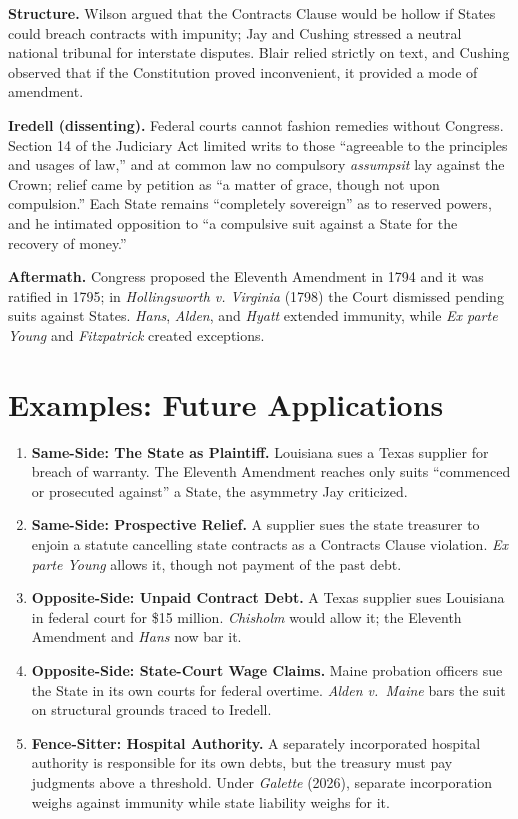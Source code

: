 \documentclass[12pt]{article}
\begin{document}
\textbf{Structure.} Wilson argued that the Contracts Clause would be hollow if States could breach contracts with impunity; Jay and Cushing stressed a neutral national tribunal for interstate disputes. Blair relied strictly on text, and Cushing observed that if the Constitution proved inconvenient, it provided a mode of amendment.

\textbf{Iredell (dissenting).} Federal courts cannot fashion remedies without Congress. Section 14 of the Judiciary Act limited writs to those ``agreeable to the principles and usages of law,'' and at common law no compulsory \emph{assumpsit} lay against the Crown; relief came by petition as ``a matter of grace, though not upon compulsion.'' Each State remains ``completely sovereign'' as to reserved powers, and he intimated opposition to ``a compulsive suit against a State for the recovery of money.''

\textbf{Aftermath.} Congress proposed the Eleventh Amendment in 1794 and it was ratified in 1795; in \emph{Hollingsworth v. Virginia} (1798) the Court dismissed pending suits against States. \emph{Hans}, \emph{Alden}, and \emph{Hyatt} extended immunity, while \emph{Ex parte Young} and \emph{Fitzpatrick} created exceptions.

\section{Examples: Future Applications}

\begin{enumerate}
\item \textbf{Same-Side: The State as Plaintiff.} Louisiana sues a Texas supplier for breach of warranty. The Eleventh Amendment reaches only suits ``commenced or prosecuted against'' a State, the asymmetry Jay criticized.
\item \textbf{Same-Side: Prospective Relief.} A supplier sues the state treasurer to enjoin a statute cancelling state contracts as a Contracts Clause violation. \emph{Ex parte Young} allows it, though not payment of the past debt.
\item \textbf{Opposite-Side: Unpaid Contract Debt.} A Texas supplier sues Louisiana in federal court for \$15 million. \emph{Chisholm} would allow it; the Eleventh Amendment and \emph{Hans} now bar it.
\item \textbf{Opposite-Side: State-Court Wage Claims.} Maine probation officers sue the State in its own courts for federal overtime. \emph{Alden v.\ Maine} bars the suit on structural grounds traced to Iredell.
\item \textbf{Fence-Sitter: Hospital Authority.} A separately incorporated hospital authority is responsible for its own debts, but the treasury must pay judgments above a threshold. Under \emph{Galette} (2026), separate incorporation weighs against immunity while state liability weighs for it.
\end{enumerate}
\end{document}
